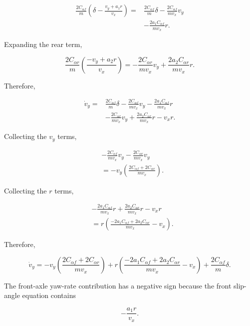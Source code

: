 \documentclass[12pt,a4paper]{article}
\begin{document}
\begin{align}
\frac{2C_{\alpha f}}{m}
\left(
\delta-\frac{v_y+a_1r}{v_x}
\right)
={}&
\frac{2C_{\alpha f}}{m}\delta
-
\frac{2C_{\alpha f}}{mv_x}v_y
\nonumber\\
&-
\frac{2a_1C_{\alpha f}}{mv_x}r.
\end{align}

Expanding the rear term,

\begin{equation}
\frac{2C_{\alpha r}}{m}
\left(
\frac{-v_y+a_2r}{v_x}
\right)
=
-\frac{2C_{\alpha r}}{mv_x}v_y
+
\frac{2a_2C_{\alpha r}}{mv_x}r.
\end{equation}

Therefore,

\begin{align}
\dot v_y
={}&
\frac{2C_{\alpha f}}{m}\delta
-\frac{2C_{\alpha f}}{mv_x}v_y
-\frac{2a_1C_{\alpha f}}{mv_x}r
\nonumber\\
&-\frac{2C_{\alpha r}}{mv_x}v_y
+\frac{2a_2C_{\alpha r}}{mv_x}r
-v_xr.
\end{align}

Collecting the $v_y$ terms,

\begin{align}
&
-\frac{2C_{\alpha f}}{mv_x}v_y
-
\frac{2C_{\alpha r}}{mv_x}v_y
\nonumber\\
&=
-v_y
\left(
\frac{2C_{\alpha f}+2C_{\alpha r}}{mv_x}
\right).
\end{align}

Collecting the $r$ terms,

\begin{align}
&
-\frac{2a_1C_{\alpha f}}{mv_x}r
+
\frac{2a_2C_{\alpha r}}{mv_x}r
-v_xr
\nonumber\\
&=
r
\left(
\frac{-2a_1C_{\alpha f}+2a_2C_{\alpha r}}
{mv_x}
-v_x
\right).
\end{align}

Therefore,

\begin{equation}
\boxed{
\dot v_y
=
-v_y
\left(
\frac{2C_{\alpha f}+2C_{\alpha r}}
{mv_x}
\right)
+
r
\left(
\frac{-2a_1C_{\alpha f}+2a_2C_{\alpha r}}
{mv_x}
-v_x
\right)
+
\frac{2C_{\alpha f}}{m}\delta
}.
\end{equation}

The front-axle yaw-rate contribution has a negative sign because the front
slip-angle equation contains

\begin{equation}
-\frac{a_1r}{v_x}.
\end{equation}
\end{document}
